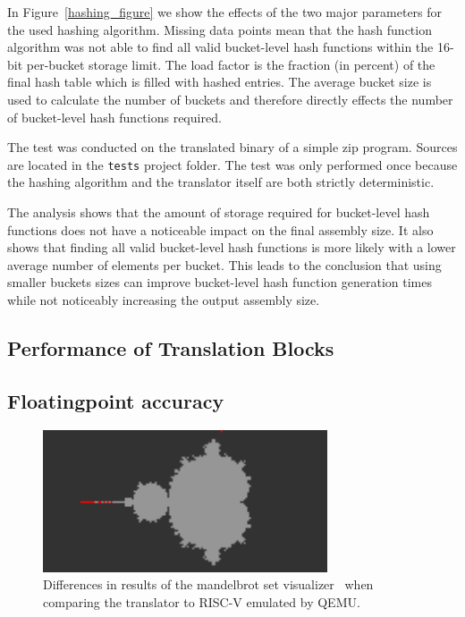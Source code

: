 \documentclass[course=eragp]{aspdoc}
\begin{document}
In Figure~\ref{hashing_figure} we show the effects of the two major parameters for the used hashing
algorithm. Missing data points mean that the hash function algorithm was not able to find all valid
bucket-level hash functions within the 16-bit per-bucket storage limit. The load factor is the fraction (in percent) of the
final hash table which is filled with
hashed entries. The average bucket size is used to calculate the number of buckets and therefore
directly effects the number of bucket-level hash functions required.

\par

The test was conducted on the translated binary of a simple zip program. Sources are located in the
\texttt{tests} project folder. The test was only performed once because the hashing algorithm and
the translator itself are both strictly deterministic.

\par

The analysis shows that
the amount of storage required for bucket-level hash functions does not have a noticeable impact on
the final assembly size. It also shows that finding all valid bucket-level hash functions is more
likely with a lower average number of elements per bucket. This leads to the conclusion that using
smaller buckets sizes can improve bucket-level hash function generation times while not noticeably
increasing the output assembly size.

\subsection{Performance of Translation Blocks}

\subsection{Floatingpoint accuracy}

\begin{figure}[H]
    \centering
    \includegraphics[width=0.75\textwidth]{images/mandelbrot_differences/translated_diff.png}
    \caption{Differences in results of the mandelbrot set visualizer~\cite{mandelbrot_program} when
        comparing the translator to RISC-V emulated by QEMU.}\label{fig:mandelbrot_diff_translator}
\end{figure}
\end{document}
